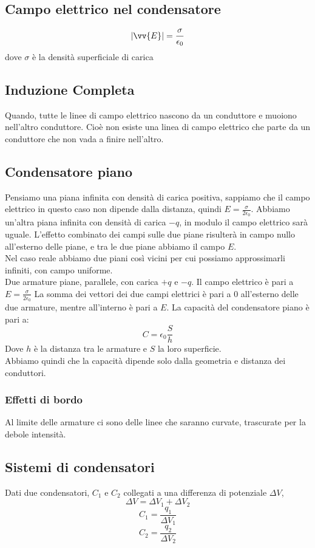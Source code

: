 \documentclass[a4paper]{report}
\begin{document}
  \subsection{Campo elettrico nel condensatore}
  $$ |\vv{E}| = \frac{\sigma}{\epsilon_0} $$
  dove $\sigma$ è la densità superficiale di carica

  \subsection{Induzione Completa}
  Quando, tutte le linee di campo elettrico nascono da un conduttore e muoiono nell'altro conduttore. Cioè non esiste una linea di campo elettrico che parte da un conduttore che non vada a finire nell'altro.

  \subsection{Condensatore piano}
  Pensiamo una piana infinita con densità di carica positiva, sappiamo che il campo elettrico in questo caso non dipende dalla distanza, quindi $E= \frac{\sigma}{2\epsilon_0}$. Abbiamo un'altra piana infinita con densità di carica $-q$, in modulo il campo elettrico sarà uguale.
  L'effetto combinato dei campi sulle due piane risulterà in campo nullo all'esterno delle piane, e tra le due piane abbiamo il campo $E$.\\
  Nel caso reale abbiamo due piani così vicini per cui possiamo approssimarli infiniti, con campo uniforme.\\
  Due armature piane, parallele, con carica $+q$ e $-q$.
  Il campo elettrico è pari a \( E = \frac{\sigma}{2\epsilon_0} \)
  La somma dei vettori dei due campi elettrici è pari a $0$ all'esterno delle due armature, mentre all'interno è pari a $E$. La capacità del condensatore piano è pari a:
  $$ C = \epsilon_0 \frac{S}{h} $$
  Dove $h$ è la distanza tra le armature e $S$ la loro superficie.\\
  Abbiamo quindi che la capacità dipende solo dalla geometria e distanza dei conduttori.

  \subsubsection{Effetti di bordo}
  Al limite delle armature ci sono delle linee che saranno curvate, trascurate per la debole intensità.

  \subsection{Sistemi di condensatori}
  Dati due condensatori, $C_1$ e $C_2$ collegati a una differenza di potenziale $\Delta V$,
  $$ \Delta V = \Delta V_1 + \Delta V_2 $$
  $$ C_1 = \frac{q_1}{\Delta V_1} $$
  $$ C_2 = \frac{q_2}{\Delta V_2} $$
\end{document}
